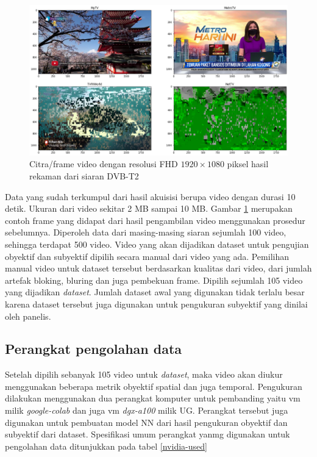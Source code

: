 \begin{figure}[H]
	\vspace{-0.1cm}
	\begin{center}
		\includegraphics[width=1\columnwidth]{bab4/Gambar/hires-img.png}
	\end{center}
	\vspace{-0.2cm}
	\caption{Citra/frame video dengan resolusi FHD $1920\times1080$ piksel hasil rekaman dari siaran DVB-T2}
	\label{hires-img}
\end{figure}

Data yang sudah terkumpul dari hasil akuisisi berupa video dengan durasi 10 detik. Ukuran dari video sekitar 2 MB sampai 10 MB. Gambar \ref{hires-img} merupakan contoh frame yang didapat dari hasil pengambilan video menggunakan prosedur sebelumnya. Diperoleh data dari masing-masing siaran sejumlah 100 video, sehingga terdapat 500 video. Video yang akan dijadikan dataset untuk pengujian obyektif dan subyektif dipilih secara manual dari video yang ada. Pemilihan manual video untuk dataset tersebut berdasarkan kualitas dari video, dari jumlah artefak bloking, bluring dan juga pembekuan frame. Dipilih sejumlah 105 video yang  dijadikan \textit{dataset}. Jumlah dataset awal yang digunakan tidak terlalu besar karena dataset tersebut juga digunakan untuk pengukuran subyektif yang dinilai oleh panelis.

\subsection{Perangkat pengolahan data}
\hspace{1,2cm}
Setelah dipilih sebanyak 105 video untuk \textit{dataset}, maka video akan diukur menggunakan beberapa metrik obyektif spatial dan juga temporal. Pengukuran dilakukan menggunakan dua perangkat komputer untuk pembanding yaitu vm milik \textit{google-colab} dan juga vm \textit{dgx-a100} milik UG. Perangkat tersebut juga digunakan untuk pembuatan model NN dari hasil pengukuran obyektif dan subyektif dari dataset. Spesifikasi umum perangkat yanmg digunakan untuk pengolahan data ditunjukkan pada tabel \ref{nvidia-used}

